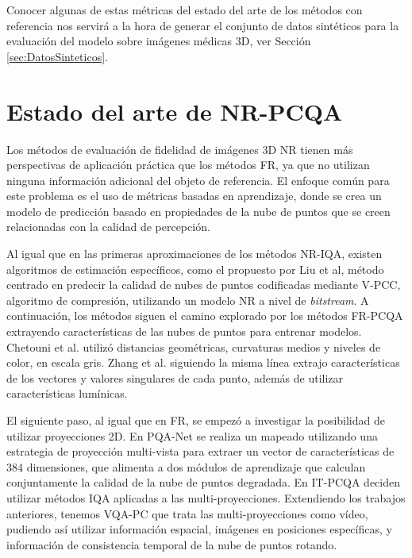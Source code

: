 Conocer algunas de estas métricas del estado del arte de los métodos con referencia nos 
servirá a la hora de generar el conjunto de datos sintéticos para la evaluación 
del modelo sobre imágenes médicas 3D, ver Sección \ref{sec:DatosSinteticos}. 

\section{Estado del arte de NR-PCQA}
Los métodos de evaluación de fidelidad de imágenes 3D NR tienen más perspectivas 
de aplicación práctica que los métodos FR, ya que no utilizan ninguna información 
adicional del objeto de referencia.
El enfoque común para este problema es el uso de métricas basadas en 
aprendizaje, donde se crea un modelo de predicción basado en propiedades de la 
nube de puntos que se creen relacionadas con la calidad de percepción.

Al igual que en las primeras aproximaciones de los métodos NR-IQA, existen 
algoritmos de estimación específicos, como el propuesto por Liu et al\cite{bitstreamPCQ},
método centrado en predecir la calidad de nubes de puntos 
codificadas mediante V-PCC, algoritmo de compresión, utilizando un modelo NR 
a nivel de \emph{bitstream}. A continuación, los métodos siguen el camino explorado 
por los métodos FR-PCQA extrayendo características de las nubes de puntos para 
entrenar modelos.  Chetouni et al.\cite{NR-CNN-3D-PC} utilizó distancias geométricas, curvaturas medios 
y niveles de color, en escala gris. Zhang et al.\cite{NR3DQA} siguiendo la misma 
línea extrajo características de los vectores y valores singulares de cada punto,
además de utilizar características lumínicas.

El siguiente paso, al igual que en FR, se empezó a investigar la posibilidad 
de utilizar proyecciones 2D. En PQA-Net\cite{PQA-Net} se realiza un mapeado 
utilizando una estrategia de proyección multi-vista para extraer un vector de 
características de 384 dimensiones, que alimenta a dos módulos de aprendizaje 
que calculan conjuntamente la calidad de la nube de puntos degradada. 
En IT-PCQA\cite{IT-PCQA} deciden utilizar métodos IQA aplicadas a las multi-proyecciones.
Extendiendo los trabajos anteriores, tenemos VQA-PC\cite{VQA-PC} que trata las 
multi-proyecciones como vídeo, pudiendo así utilizar información espacial, 
imágenes en posiciones específicas, y información de consistencia temporal 
de la nube de puntos rotando. 

